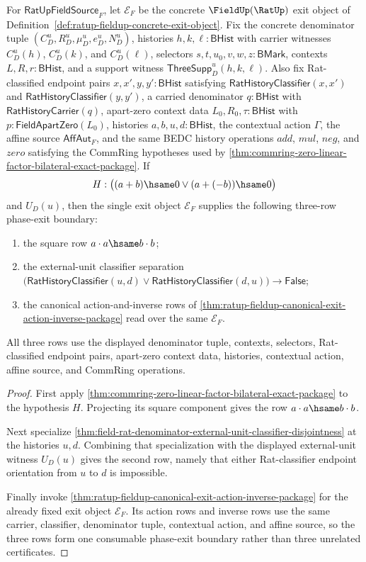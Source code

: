 \begin{theorem}
\label{thm:ratup-fieldup-guarded-action-inverse-external-unit-separation}
For $\mathsf{RatUpFieldSource}_F$, let $\mathcal E_F$ be the concrete
$\FieldUp(\RatUp)$ exit object of
Definition~\ref{def:ratup-fieldup-concrete-exit-object}. Fix the concrete
denominator tuple $(C_D^u,R_D^u,\mu_D^u,e_D^u,N_D^u)$, histories
$h,k,\ell:\mathsf{BHist}$ with carrier witnesses $C_D^u(h)$, $C_D^u(k)$, and
$C_D^u(\ell)$, selectors $s,t,u_0,v,w,z:\mathsf{BMark}$, contexts
$L,R,r:\mathsf{BHist}$, and a support witness
$\mathsf{ThreeSupp}_D^u(h,k,\ell)$. Also fix Rat-classified endpoint pairs
$x,x',y,y':\mathsf{BHist}$ satisfying
$\mathsf{RatHistoryClassifier}(x,x')$ and
$\mathsf{RatHistoryClassifier}(y,y')$, a carried denominator
$q:\mathsf{BHist}$ with $\mathsf{RatHistoryCarrier}(q)$, apart-zero context
data $L_0,R_0,\tau:\mathsf{BHist}$ with
$p:\mathsf{FieldApartZero}(L_0)$, histories $a,b,u,d:\mathsf{BHist}$, the
contextual action $\Gamma$, the affine source $\mathsf{AffAut}_F$, and the same
BEDC history operations $add$, $mul$, $neg$, and $zero$ satisfying the CommRing
hypotheses used by
\autoref{thm:commring-zero-linear-factor-bilateral-exact-package}. If
$$
H:\bigl((a+b)\hsame0 \lor (a+(-b))\hsame0\bigr)
$$
and $U_D(u)$, then the single exit object $\mathcal E_F$ supplies the following
three-row phase-exit boundary:
\begin{enumerate}
  \item the square row $a\cdot a\hsame b\cdot b$;
  \item the external-unit classifier separation
  $\bigl(\mathsf{RatHistoryClassifier}(u,d)\lor
  \mathsf{RatHistoryClassifier}(d,u)\bigr)\to\mathsf{False}$;
  \item the canonical action-and-inverse rows of
  \autoref{thm:ratup-fieldup-canonical-exit-action-inverse-package} read over
  the same $\mathcal E_F$.
\end{enumerate}
All three rows use the displayed denominator tuple, contexts, selectors,
Rat-classified endpoint pairs, apart-zero context data, histories, contextual
action, affine source, and CommRing operations.
\end{theorem}
\begin{proof}
First apply
\autoref{thm:commring-zero-linear-factor-bilateral-exact-package} to the
hypothesis $H$. Projecting its square component gives the row
$a\cdot a\hsame b\cdot b$.

Next specialize
\autoref{thm:field-rat-denominator-external-unit-classifier-disjointness} at
the histories $u,d$. Combining that specialization with the displayed
external-unit witness $U_D(u)$ gives the second row, namely that either
Rat-classifier endpoint orientation from $u$ to $d$ is impossible.

Finally invoke
\autoref{thm:ratup-fieldup-canonical-exit-action-inverse-package} for the
already fixed exit object $\mathcal E_F$. Its action rows and inverse rows use
the same carrier, classifier, denominator tuple, contextual action, and affine
source, so the three rows form one consumable phase-exit boundary rather than
three unrelated certificates.
\end{proof}

